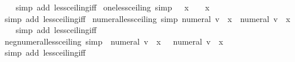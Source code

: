 \begin{isabellebody}
%
\isadelimproof
\ \ %
\endisadelimproof
%
\isatagproof
{}\isamarkupfalse%
\ {\isacharparenleft}{\kern0pt}simp\ add{\isacharcolon}{\kern0pt}\ less{\isacharunderscore}{\kern0pt}ceiling{\isacharunderscore}{\kern0pt}iff{\isacharparenright}{\kern0pt}%
\endisatagproof
{\isafoldproof}%
%
\isadelimproof
\isanewline
%
\endisadelimproof
\isanewline
{}\isamarkupfalse%
\ one{\isacharunderscore}{\kern0pt}less{\isacharunderscore}{\kern0pt}ceiling\ {\isacharbrackleft}{\kern0pt}simp{\isacharbrackright}{\kern0pt}{\isacharcolon}{\kern0pt}\ {\isachardoublequoteopen}{}\ {\isacharless}{\kern0pt}\ {\isasymlceil}x{\isasymrceil}\ {\isasymlongleftrightarrow}\ {}\ {\isacharless}{\kern0pt}\ x{\isachardoublequoteclose}\isanewline
%
\isadelimproof
\ \ %
\endisadelimproof
%
\isatagproof
{}\isamarkupfalse%
\ {\isacharparenleft}{\kern0pt}simp\ add{\isacharcolon}{\kern0pt}\ less{\isacharunderscore}{\kern0pt}ceiling{\isacharunderscore}{\kern0pt}iff{\isacharparenright}{\kern0pt}%
\endisatagproof
{\isafoldproof}%
%
\isadelimproof
\isanewline
%
\endisadelimproof
\isanewline
{}\isamarkupfalse%
\ numeral{\isacharunderscore}{\kern0pt}less{\isacharunderscore}{\kern0pt}ceiling\ {\isacharbrackleft}{\kern0pt}simp{\isacharbrackright}{\kern0pt}{\isacharcolon}{\kern0pt}\ {\isachardoublequoteopen}numeral\ v\ {\isacharless}{\kern0pt}\ {\isasymlceil}x{\isasymrceil}\ {\isasymlongleftrightarrow}\ numeral\ v\ {\isacharless}{\kern0pt}\ x{\isachardoublequoteclose}\isanewline
%
\isadelimproof
\ \ %
\endisadelimproof
%
\isatagproof
{}\isamarkupfalse%
\ {\isacharparenleft}{\kern0pt}simp\ add{\isacharcolon}{\kern0pt}\ less{\isacharunderscore}{\kern0pt}ceiling{\isacharunderscore}{\kern0pt}iff{\isacharparenright}{\kern0pt}%
\endisatagproof
{\isafoldproof}%
%
\isadelimproof
\isanewline
%
\endisadelimproof
\isanewline
{}\isamarkupfalse%
\ neg{\isacharunderscore}{\kern0pt}numeral{\isacharunderscore}{\kern0pt}less{\isacharunderscore}{\kern0pt}ceiling\ {\isacharbrackleft}{\kern0pt}simp{\isacharbrackright}{\kern0pt}{\isacharcolon}{\kern0pt}\ {\isachardoublequoteopen}{\isacharminus}{\kern0pt}\ numeral\ v\ {\isacharless}{\kern0pt}\ {\isasymlceil}x{\isasymrceil}\ {\isasymlongleftrightarrow}\ {\isacharminus}{\kern0pt}\ numeral\ v\ {\isacharless}{\kern0pt}\ x{\isachardoublequoteclose}\isanewline
%
\isadelimproof
\ \ %
\endisadelimproof
%
\isatagproof
{}\isamarkupfalse%
\ {\isacharparenleft}{\kern0pt}simp\ add{\isacharcolon}{\kern0pt}\ less{\isacharunderscore}{\kern0pt}ceiling{\isacharunderscore}{\kern0pt}iff{\isacharparenright}{\kern0pt}%

\end{isabellebody}

